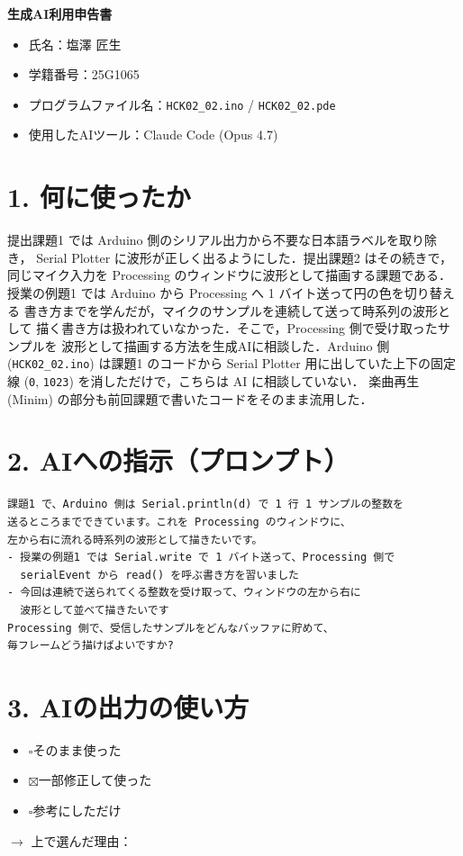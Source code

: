 \documentclass[a4paper,11pt,dvipdfmx]{jsarticle}
\newcommand{\cboxon}{$\boxtimes$}
\newcommand{\cboxoff}{$\square$}
\begin{document}
{\LARGE\bfseries 生成AI利用申告書}
\vspace{1em}

\begin{itemize}
  \item 氏名：塩澤 匠生
  \item 学籍番号：25G1065
  \item プログラムファイル名：\texttt{HCK02\_02.ino} / \texttt{HCK02\_02.pde}
  \item 使用したAIツール：Claude Code (Opus 4.7)
\end{itemize}

\section*{1. 何に使ったか}
提出課題1 では Arduino 側のシリアル出力から不要な日本語ラベルを取り除き，
Serial Plotter に波形が正しく出るようにした．提出課題2 はその続きで，
同じマイク入力を Processing のウィンドウに波形として描画する課題である．
授業の例題1 では Arduino から Processing へ 1 バイト送って円の色を切り替える
書き方までを学んだが，マイクのサンプルを連続して送って時系列の波形として
描く書き方は扱われていなかった．そこで，Processing 側で受け取ったサンプルを
波形として描画する方法を生成AIに相談した．Arduino 側 (\texttt{HCK02\_02.ino})
は課題1 のコードから Serial Plotter 用に出していた上下の固定線
(\texttt{0}, \texttt{1023}) を消しただけで，こちらは AI に相談していない．
楽曲再生 (Minim) の部分も前回課題で書いたコードをそのまま流用した．

\section*{2. AIへの指示（プロンプト）}
\begin{lstlisting}
課題1 で、Arduino 側は Serial.println(d) で 1 行 1 サンプルの整数を
送るところまでできています。これを Processing のウィンドウに、
左から右に流れる時系列の波形として描きたいです。
- 授業の例題1 では Serial.write で 1 バイト送って、Processing 側で
  serialEvent から read() を呼ぶ書き方を習いました
- 今回は連続で送られてくる整数を受け取って、ウィンドウの左から右に
  波形として並べて描きたいです
Processing 側で、受信したサンプルをどんなバッファに貯めて、
毎フレームどう描けばよいですか?
\end{lstlisting}

\section*{3. AIの出力の使い方}
\begin{itemize}
  \item \cboxoff そのまま使った
  \item \cboxon 一部修正して使った
  \item \cboxoff 参考にしただけ
\end{itemize}
$\rightarrow$ 上で選んだ理由：
\end{document}
